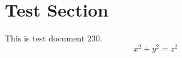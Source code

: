 \documentclass{article}
\begin{document}
\section{Test Section}
This is test document 230.
\begin{equation}
x^2 + y^2 = z^2
\end{equation}
\end{document}

